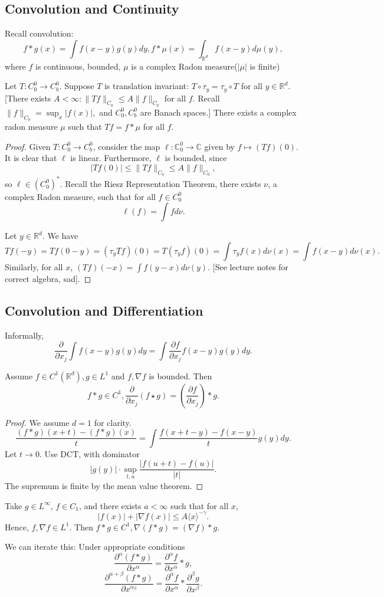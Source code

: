 \documentclass[11pt]{scrartcl}
\newcommand{\R}{\mathbb{R}}
\newcommand{\C}{\mathbb C}
\newcommand{\<}{\langle}
\renewcommand{\>}{\rangle}
\begin{document}
\subsection{Convolution and Continuity}
Recall convolution:
$$f * g(x) = \int f(x-y)g(y)dy, f*\mu(x) = \int_{\R^d}f(x-y)d\mu(y),$$
where $f$ is continuous, bounded, $\mu$ is a complex Radon measure($|\mu|$ is finite) 
\begin{proposition} Let $T : C_0^0 \rightarrow C_b^0$.  Suppose $T$ is translation invariant: $T \circ \tau_y = \tau_y \circ T$ for all $y \in \R^d$.  [There exists $A < \infty : \|Tf\|_{C_0} \le A\|f\|_{C_0}$ for all $f$. Recall $\|f\|_{C_0} = \sup_x |f(x)|,$ and $C_0^0, C_b^0$ are Banach spaces.]  There exists a complex radon measure $\mu$ such that $Tf = f * \mu$ for all $f$.
\end{proposition}
\begin{proof}
Given $T: C_0^0 \rightarrow C_b^0$, consider the map $\ell : \C_0^0 \rightarrow \C$ given by $f \mapsto (Tf)(0)$.  It is clear that $\ell$ is linear.  Furthermore, $\ell$ is bounded, since $$|Tf(0)| \le \|Tf\|_{C_0} \le A\|f\|_{C_0},$$
so $\ell \in (C_0^0)^*.$  Recall the Riesz Representation Theorem, there exists $\nu$, a complex Radon measure, such that for all $f \in C_0^0$
$$\ell(f) = \int f d\nu.$$

Let $y \in \R^d$.  We have 
$$Tf(-y) = Tf(0 - y) = (\tau_yTf)(0) = T(\tau_y f)(0) = \int \tau_y f(x) d\nu(x) = \int f(x-y)d\nu(x).$$
Similarly, for all $x$, $(Tf)(-x) = \int f(y-x)d\nu(y)$.  [See lecture notes for correct algebra, sad].
\end{proof}
\subsection{Convolution and Differentiation}
Informally,
$$\frac{\partial}{\partial x_j} \int f(x-y)g(y)dy = \int \frac{\partial f}{\partial x_j}f(x-y)g(y)dy.$$
\begin{proposition} Assume $f \in C^1(\R^d), g \in L^1$ and $f, \nabla f$ is bounded.    Then
$$f*g \in C^1, \frac{\partial}{\partial x_j}(f \star g) = \left (\frac{\partial f}{\partial x_j}\right) * g.$$
\end{proposition}
\begin{proof}
We assume $d=1$ for clarity. 
$$\frac{(f*g)(x+t) - (f*g)(x)}{t} = \int \frac{f(x+t-y) - f(x-y)}{t}g(y)dy. $$
Let $t \rightarrow 0$.  Use DCT, with dominator $$|g(y)|\cdot \sup_{t, u} \frac{|f(u+t) - f(u)|}{|t|}.$$ The supremum is finite by the mean value theorem.
\end{proof}
\begin{example} Take $g \in L^\infty$, $f \in C_1$, and there exists $a < \infty$ such that for all $x$, $$|f(x)| + |\nabla f(x)| \le A \<x\>^{-\gamma}.$$
Hence, $f, \nabla f \in L^1$.  Then $f * g \in C^1, \nabla(f*g) =(\nabla f)*g.$
\end{example}
We can iterate this: Under appropriate conditions
$$\frac{\partial ^{\alpha}(f*g)}{\partial x^{\alpha}} = \frac{\partial ^{\alpha}f}{\partial x^{\alpha}}*g,$$
$$\frac{\partial ^{\alpha+\beta}(f*g)}{\partial x^{\alpha_\beta}} = \frac{\partial ^{\alpha}f}{\partial x^{\alpha}}*\frac{\partial ^{\beta}g}{\partial x^{\beta}}.$$
\end{document}

